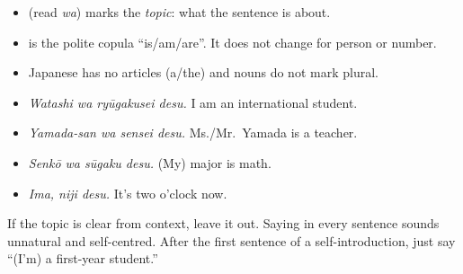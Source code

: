 \begin{center}
\end{center}

\begin{itemize}
  \item {} (read \emph{wa}) marks the \emph{topic}: what the sentence is about.
  \item {} is the polite copula ``is/am/are''. It does not change for person or
        number.
  \item Japanese has no articles (a/the) and nouns do not mark plural.
\end{itemize}

\begin{example}
\leavevmode
\begin{itemize}
  \item {} \emph{Watashi wa ryūgakusei desu.}
        I am an international student.
  \item {} \emph{Yamada-san wa sensei desu.}
        Ms./Mr.\ Yamada is a teacher.
  \item {} \emph{Senkō wa sūgaku desu.} (My) major is math.
  \item {} \emph{Ima, niji desu.} It's two o'clock now.
\end{itemize}
\end{example}

\begin{important}
If the topic is clear from context, leave it out. Saying  in every sentence
sounds unnatural and self-centred. After the first sentence of a self-introduction,
just say  ``(I'm) a first-year student.''
\end{important}

